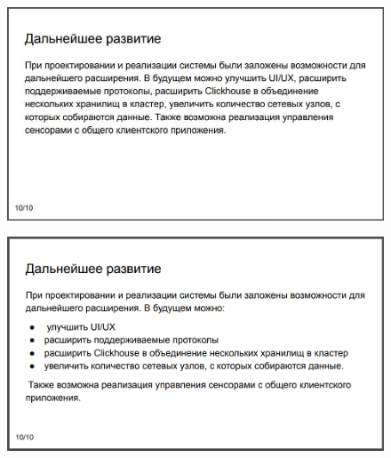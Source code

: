 \begin{figure}[H]
	\centering
	\includegraphics[scale=0.35]{pr10.jpg}
\end{figure}
\begin{figure}[H]
	\centering
	\includegraphics[scale=0.35]{pr11.png}
\end{figure}
